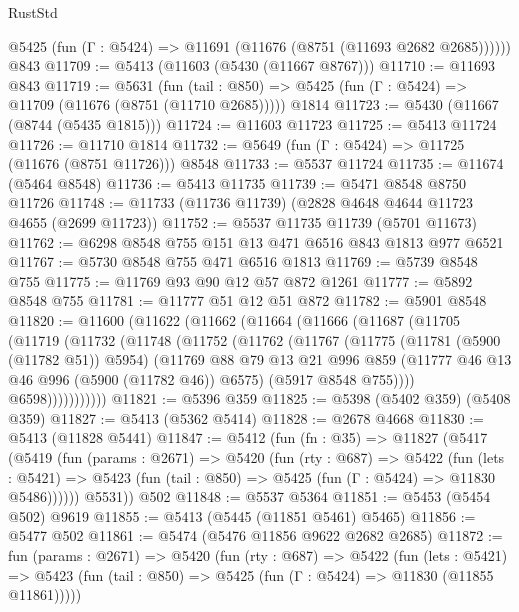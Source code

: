 \begin{lexlean}{RustStd}
\begin{coremodule}
      @5425 (fun (Γ : @5424) => @11691 (@11676 (@8751 (@11693 @2682 @2685))))))
    @843
@11709 := @5413 (@11603 (@5430 (@11667 @8767)))
@11710 := @11693 @843
@11719 := @5631
    (fun (tail : @850) => @5425 (fun (Γ : @5424) => @11709 (@11676 (@8751 (@11710 @2685)))))
    @1814
@11723 := @5430 (@11667 (@8744 (@5435 @1815)))
@11724 := @11603 @11723
@11725 := @5413 @11724
@11726 := @11710 @1814
@11732 := @5649 (fun (Γ : @5424) => @11725 (@11676 (@8751 @11726))) @8548
@11733 := @5537 @11724
@11735 := @11674 (@5464 @8548)
@11736 := @5413 @11735
@11739 := @5471 @8548 @8750 @11726
@11748 := @11733 (@11736 @11739) (@2828 @4648 @4644 @11723 @4655 (@2699 @11723))
@11752 := @5537 @11735 @11739 (@5701 @11673)
@11762 := @6298 @8548 @755 @151 @13 @471 @6516 @843 @1813 @977 @6521
@11767 := @5730 @8548 @755 @471 @6516 @1813
@11769 := @5739 @8548 @755
@11775 := @11769 @93 @90 @12 @57 @872 @1261
@11777 := @5892 @8548 @755
@11781 := @11777 @51 @12 @51 @872
@11782 := @5901 @8548
@11820 := @11600
    (@11622
      (@11662
        (@11664
          (@11666
            (@11687
              (@11705
                (@11719
                  (@11732
                    (@11748
                      (@11752
                        (@11762
                          (@11767
                            (@11775
                              (@11781 (@5900 (@11782 @51)) @5954)
                              (@11769
                                @88
                                @79
                                @13
                                @21
                                @996
                                @859
                                (@11777 @46 @13 @46 @996 (@5900 (@11782 @46)) @6575)
                                (@5917 @8548 @755))))
                          @6598)))))))))))
@11821 := @5396 @359
@11825 := @5398 (@5402 @359) (@5408 @359)
@11827 := @5413 (@5362 @5414)
@11828 := @2678 @4668
@11830 := @5413 (@11828 @5441)
@11847 := @5412
    (fun (fn : @35) =>
    @11827
      (@5417
        (@5419
          (fun (params : @2671) =>
          @5420
            (fun (rty : @687) =>
            @5422
              (fun (lets : @5421) =>
              @5423 (fun (tail : @850) => @5425 (fun (Γ : @5424) => @11830 @5486))))))
        @5531))
    @502
@11848 := @5537 @5364
@11851 := @5453 (@5454 @502) @9619
@11855 := @5413 (@5445 (@11851 @5461) @5465)
@11856 := @5477 @502
@11861 := @5474 (@5476 @11856 @9622 @2682 @2685)
@11872 := fun (params : @2671) =>
  @5420
    (fun (rty : @687) =>
    @5422
      (fun (lets : @5421) =>
      @5423 (fun (tail : @850) => @5425 (fun (Γ : @5424) => @11830 (@11855 @11861)))))

\end{coremodule}
\end{lexlean}

